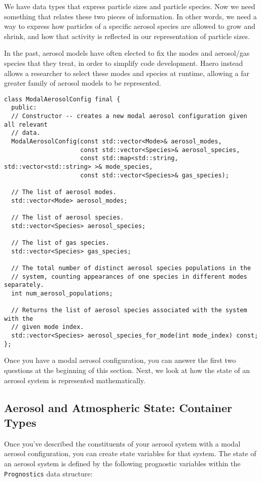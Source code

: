 We have data types that express particle sizes and particle species. Now we
need something that relates these two pieces of information. In other words,
we need a way to express how particles of a specific aerosol species are allowed
to grow and shrink, and how that activity is reflected in our representation
of particle sizes.

In the past, aerosol models have often elected to fix the modes and aerosol/gas
species that they treat, in order to simplify code development. Haero instead
allows a researcher to select these modes and species at runtime, allowing a
far greater family of aerosol models to be represented.

\begin{lstlisting}
class ModalAerosolConfig final {
  public:
  // Constructor -- creates a new modal aerosol configuration given all relevant
  // data.
  ModalAerosolConfig(const std::vector<Mode>& aerosol_modes,
                     const std::vector<Species>& aerosol_species,
                     const std::map<std::string, std::vector<std::string> >& mode_species,
                     const std::vector<Species>& gas_species);

  // The list of aerosol modes.
  std::vector<Mode> aerosol_modes;

  // The list of aerosol species.
  std::vector<Species> aerosol_species;

  // The list of gas species.
  std::vector<Species> gas_species;

  // The total number of distinct aerosol species populations in the
  // system, counting appearances of one species in different modes separately.
  int num_aerosol_populations;

  // Returns the list of aerosol species associated with the system with the
  // given mode index.
  std::vector<Species> aerosol_species_for_mode(int mode_index) const;
};
\end{lstlisting}

Once you have a modal aerosol configuration, you can answer the first two
questions at the beginning of this section. Next, we look at how the state of
an aerosol system is represented mathematically.

\subsection{Aerosol and Atmospheric State: Container Types}

Once you've described the constituents of your aerosol system with a modal
aerosol configuration, you can create state variables for that system. The state
of an aerosol system is defined by the following prognostic variables within the
\texttt{Prognostics} data structure:


